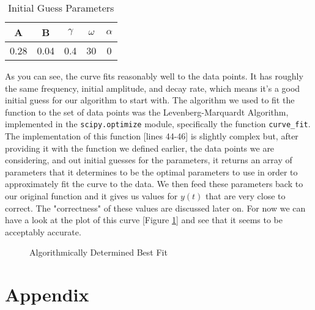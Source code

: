 \documentclass[12pt]{article}
\begin{document}
    \begin{table}[H]
        \centering
        \begin{tabular}{c c c c c}
            \hline
            A & B & $\gamma$ & $\omega$ & $\alpha$ \\
            \hline
            0.28 & 0.04 & 0.4 & 30 & 0 \\
            \hline
        \end{tabular}
        \caption{Initial Guess Parameters}
        \label{table:Initial Params}
    \end{table}
    
    \noindent
    As you can see, the curve fits reasonably well to the data points. It has roughly the same 
    frequency, initial amplitude, and decay rate, which means it's a good initial guess for our 
    algorithm to start with. 
    \newline
    \newline
    The algorithm we used to fit the function to the set of data points was the Levenberg-Marquardt 
    Algorithm, implemented in the \texttt{scipy.optimize} module, specifically the function 
    \texttt{curve\_fit}. The implementation of this function [lines 44-46] is slightly complex 
    but, after providing it with the function we defined earlier, the data points we are 
    considering, and out initial guesses for the parameters, it returns an array of parameters 
    that it determines to be the optimal parameters to use in order to approximately fit the 
    curve to the data. We then feed these parameters back to our original function and it gives 
    us values for $y(t)$ that are very close to correct. The "correctness" of these values are 
    discussed later on. For now we can have a look at the plot of this curve [Figure \ref{fig:Best Fit}] 
    and see that it seems to be acceptably accurate. 

    \begin{figure}[H]
        \begin{center}
           \scalebox{.8}{}
           \caption{Algorithmically Determined Best Fit}
           \label{fig:Best Fit}
        \end{center}
    \end{figure}
    
    


    \newpage
    \section{Appendix}
    
    
    
\end{document}
